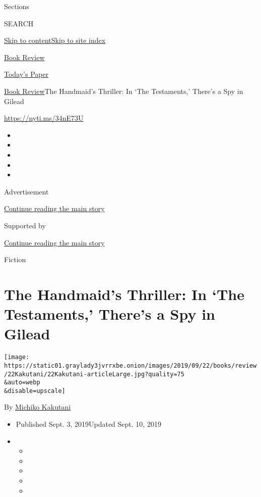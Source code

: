 Sections

SEARCH

\protect\hyperlink{site-content}{Skip to
content}\protect\hyperlink{site-index}{Skip to site index}

\href{https://www.nytimes3xbfgragh.onion/section/books/review}{Book
Review}

\href{https://myaccount.nytimes3xbfgragh.onion/auth/login?response_type=cookie\&client_id=vi}{}

\href{https://www.nytimes3xbfgragh.onion/section/todayspaper}{Today's
Paper}

\href{/section/books/review}{Book Review}\textbar{}The Handmaid's
Thriller: In `The Testaments,' There's a Spy in Gilead

\url{https://nyti.ms/34nE73U}

\begin{itemize}
\item
\item
\item
\item
\item
\end{itemize}

Advertisement

\protect\hyperlink{after-top}{Continue reading the main story}

Supported by

\protect\hyperlink{after-sponsor}{Continue reading the main story}

Fiction

\hypertarget{the-handmaids-thriller-in-the-testaments-theres-a-spy-in-gilead}{%
\section{The Handmaid's Thriller: In `The Testaments,' There's a Spy in
Gilead}\label{the-handmaids-thriller-in-the-testaments-theres-a-spy-in-gilead}}

\texttt{[image: https://static01.graylady3jvrrxbe.onion/images/2019/09/22/books/review/22Kakutani/22Kakutani-articleLarge.jpg?quality=75\\\&auto=webp\\\&disable=upscale]}

By \href{https://www.nytimes3xbfgragh.onion/by/michiko-kakutani}{Michiko
Kakutani}

\begin{itemize}
\item
  Published Sept. 3, 2019Updated Sept. 10, 2019
\item
  \begin{itemize}
  \item
  \item
  \item
  \item
  \item
  \end{itemize}
\end{itemize}

